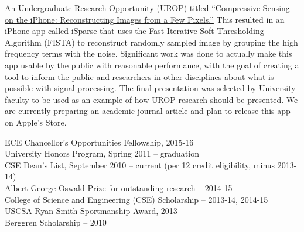     An Undergraduate Research Opportunity (UROP) titled \href{\appReport}{``Compressive Sensing on the iPhone: Reconstructing Images from a Few Pixels.''} This resulted in an iPhone app called iSparse that uses the Fast Iterative Soft Thresholding Algorithm (FISTA) to reconstruct randomly sampled image by grouping the high frequency terms with the noise. Significant work was done to actually make this app usable by the public with reasonable performance, with the goal of creating a tool to inform the public and researchers in other disciplines about what is possible with signal processing. The final presentation was selected by University faculty to be used as an example of how UROP research should be presented. We are currently preparing an academic journal article and plan to release this app on Apple's Store.

\nocite{*}
    \vspace{0.10em}
    \printbibliography[heading=none, type=inproceedings, resetnumbers=true]
    \vspace{0.10em}
    \printbibliography[heading=none, type=unpublished, resetnumbers=true]


    ECE Chancellor's Opportunities Fellowship, 2015-16
    \vspace{0.3em}\\
    University Honors Program, Spring 2011 -- graduation
    \vspace{0.3em}\\
    CSE Dean's List, September 2010 -- current (per 12 credit eligibility, minus 2013-14)
    \vspace{0.3em}\\
    Albert George Oswald Prize for outstanding research -- 2014-15
    \vspace{0.3em}\\
    College of Science and Engineering (CSE) Scholarship -- 2013-14, 2014-15
    \vspace{0.3em}\\
    USCSA Ryan Smith Sportmanship Award, 2013
    \vspace{0.3em}\\
    Berggren Scholarship -- 2010

